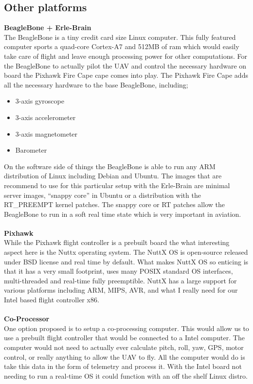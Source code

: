\documentclass[letterpaper,10pt,notitlepage,fleqn]{article}
\begin{document}
\subsection{Other platforms}
\textbf{BeagleBone + Erle-Brain} \\
\indent The BeagleBone is a tiny credit card size Linux computer. This fully featured computer sports a quad-core Cortex-A7 and 512MB of ram which would easily take care of flight and leave enough processing power for other computations. For the BeagleBone to actually pilot the UAV and control the necessary hardware on board the Pixhawk Fire Cape cape comes into play. The Pixhawk Fire Cape adds all the necessary hardware to the base BeagleBone,
including;
\begin{itemize}
    \item 3-axis gyroscope
    \item 3-axis accelerometer
    \item 3-axis magnetometer
    \item Barometer
\end{itemize}
\indent On the software side of things the BeagleBone is able to run any ARM distribution of Linux including Debian and Ubuntu. The images that are recommend to use for this particular setup with the Erle-Brain are minimal server images, “snappy core” in Ubuntu or a distribution with the RT\_PREEMPT kernel patches. The snappy core or RT patches allow the BeagleBone to run in a soft real time state which is very important in aviation. 
\\ \\
\textbf{Pixhawk} \\
\indent While the Pixhawk flight controller is a prebuilt board the what interesting aspect here is the Nuttx operating system. The NuttX OS is open-source released under BSD license and real time by default. What makes NuttX OS so enticing is that it has a very small footprint, uses many POSIX standard OS interfaces, multi-threaded and real-time fully preemptible. NuttX has a large support for various platforms including ARM, MIPS, AVR, and what I really need for our Intel based flight
controller x86. 
\\ \\
\textbf{Co-Processor} \\
\indent One option proposed is to setup a co-processing computer. This would allow us to use a prebuilt flight controller that would be connected to a Intel computer. The computer would not need to actually ever calculate pitch, roll, yaw, GPS, motor control, or really anything to allow the UAV to fly. All the computer would do is take this data in the form of telemetry and process it. With the Intel board not needing to run a real-time OS it could function with an off the shelf Linux distro.
\end{document}
